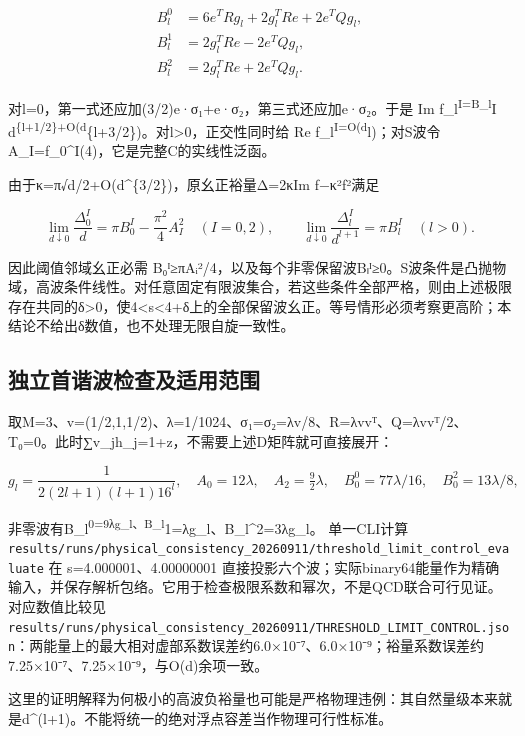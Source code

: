 \documentclass[
  10pt,
  a4paper,
]{article}
\begin{document}
\[
\begin{aligned}
B_l^0&=6e^TRg_l+2g_l^TRe+2e^TQg_l,\\
B_l^1&=2g_l^TRe-2e^TQg_l,\\
B_l^2&=2g_l^TRe+2e^TQg_l.
\end{aligned}
\]

对l=0，第一式还应加(3/2)e·σ₁+e·σ₂，第三式还应加e·σ₂。于是 Im
f\_l\textsuperscript{I=B\_l}I
d\textsuperscript{\{l+1/2\}+O(d}\{l+3/2\})。对l\textgreater0，正交性同时给
Re
f\_l\textsuperscript{I=O(d}l)；对S波令A\_I=f\_0\^{}I(4)，它是完整C的实线性泛函。

由于κ=π√d/2+O(d\^{}\{3/2\})，原幺正裕量Δ=2κIm
f−κ²\textbar f\textbar²满足

\[
\lim_{d\downarrow0}\frac{\Delta_0^I}{d}
=\pi B_0^I-\frac{\pi^2}{4}A_I^2\quad(I=0,2),
\qquad
\lim_{d\downarrow0}\frac{\Delta_l^I}{d^{l+1}}
=\pi B_l^I\quad(l>0).
\]

因此阈值邻域幺正必需
B₀ᴵ≥πAᵢ²/4，以及每个非零保留波Bₗᴵ≥0。S波条件是凸抛物域，高波条件线性。对任意固定有限波集合，若这些条件全部严格，则由上述极限存在共同的δ\textgreater0，使4\textless s\textless4+δ上的全部保留波幺正。等号情形必须考察更高阶；本结论不给出δ数值，也不处理无限自旋一致性。

\subsection{独立首谐波检查及适用范围}\label{ux72ecux7acbux9996ux8c10ux6ce2ux68c0ux67e5ux53caux9002ux7528ux8303ux56f4}

取M=3、v=(1/2,1,1/2)、λ=1/1024、σ₁=σ₂=λv/8、R=λvvᵀ、Q=λvvᵀ/2、T₀=0。此时∑v\_jh\_j=1+z，不需要上述D矩阵就可直接展开：

\[
g_l=\frac1{2(2l+1)(l+1)16^l},\quad
A_0=12\lambda,\quad A_2=\tfrac92\lambda,
\quad B_0^0=77\lambda/16,\quad B_0^2=13\lambda/8,
\]

非零波有B\_l\textsuperscript{0=9λg\_l、B\_l}1=λg\_l、B\_l\^{}2=3λg\_l。
单一CLI计算
\texttt{results/runs/physical\_consistency\_20260911/threshold\_limit\_control\_evaluate}
在 s=4.000001、4.00000001
直接投影六个波；实际binary64能量作为精确输入，并保存解析包络。它用于检查极限系数和幂次，不是QCD联合可行见证。对应数值比较见
\texttt{results/runs/physical\_consistency\_20260911/THRESHOLD\_LIMIT\_CONTROL.json}：两能量上的最大相对虚部系数误差约6.0×10⁻⁷、6.0×10⁻⁹；裕量系数误差约7.25×10⁻⁷、7.25×10⁻⁹，与O(d)余项一致。

这里的证明解释为何极小的高波负裕量也可能是严格物理违例：其自然量级本来就是d\^{}(l+1)。不能将统一的绝对浮点容差当作物理可行性标准。
\end{document}

